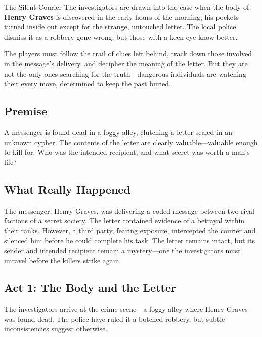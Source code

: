 \begin{WyrdScenarioHeading}{The Silent Courier}
    The investigators are drawn into the case when the body of \textbf{Henry Graves} is discovered in the early hours of the morning; his pockets turned inside out except for the strange, untouched letter. The local police dismiss it as a robbery gone wrong, but those with a keen eye know better.

    The players must follow the trail of clues left behind, track down those involved in the message's delivery, and decipher the meaning of the letter. But they are not the only ones searching for the truth—dangerous individuals are watching their every move, determined to keep the past buried.

    \subsection*{Premise} 
    A messenger is found dead in a foggy alley, clutching a letter sealed in an unknown cypher. The contents of the letter are clearly valuable—valuable enough to kill for. Who was the intended recipient, and what secret was worth a man's life?

    \subsection*{What Really Happened} 
    The messenger, Henry Graves, was delivering a coded message between two rival factions of a secret society. The letter contained evidence of a betrayal within their ranks. However, a third party, fearing exposure, intercepted the courier and silenced him before he could complete his task. The letter remains intact, but its sender and intended recipient remain a mystery—one the investigators must unravel before the killers strike again.
\end{WyrdScenarioHeading}



\subsection{Act 1: The Body and the Letter}  
The investigators arrive at the crime scene—a foggy alley where Henry Graves was found dead. The police have ruled it a botched robbery, but subtle inconsistencies suggest otherwise.  

